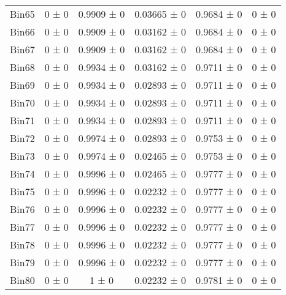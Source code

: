\begin{tabular}{@{\extracolsep{4pt}}lccccc@{}}
     Bin65 & 0 ± 0 & 0.9909 ± 0 & 0.03665 ± 0 & 0.9684 ± 0 & 0 ± 0 \\ 
     Bin66 & 0 ± 0 & 0.9909 ± 0 & 0.03162 ± 0 & 0.9684 ± 0 & 0 ± 0 \\ 
     Bin67 & 0 ± 0 & 0.9909 ± 0 & 0.03162 ± 0 & 0.9684 ± 0 & 0 ± 0 \\ 
     Bin68 & 0 ± 0 & 0.9934 ± 0 & 0.03162 ± 0 & 0.9711 ± 0 & 0 ± 0 \\ 
     Bin69 & 0 ± 0 & 0.9934 ± 0 & 0.02893 ± 0 & 0.9711 ± 0 & 0 ± 0 \\ 
     Bin70 & 0 ± 0 & 0.9934 ± 0 & 0.02893 ± 0 & 0.9711 ± 0 & 0 ± 0 \\ 
     Bin71 & 0 ± 0 & 0.9934 ± 0 & 0.02893 ± 0 & 0.9711 ± 0 & 0 ± 0 \\ 
     Bin72 & 0 ± 0 & 0.9974 ± 0 & 0.02893 ± 0 & 0.9753 ± 0 & 0 ± 0 \\ 
     Bin73 & 0 ± 0 & 0.9974 ± 0 & 0.02465 ± 0 & 0.9753 ± 0 & 0 ± 0 \\ 
     Bin74 & 0 ± 0 & 0.9996 ± 0 & 0.02465 ± 0 & 0.9777 ± 0 & 0 ± 0 \\ 
     Bin75 & 0 ± 0 & 0.9996 ± 0 & 0.02232 ± 0 & 0.9777 ± 0 & 0 ± 0 \\ 
     Bin76 & 0 ± 0 & 0.9996 ± 0 & 0.02232 ± 0 & 0.9777 ± 0 & 0 ± 0 \\ 
     Bin77 & 0 ± 0 & 0.9996 ± 0 & 0.02232 ± 0 & 0.9777 ± 0 & 0 ± 0 \\ 
     Bin78 & 0 ± 0 & 0.9996 ± 0 & 0.02232 ± 0 & 0.9777 ± 0 & 0 ± 0 \\ 
     Bin79 & 0 ± 0 & 0.9996 ± 0 & 0.02232 ± 0 & 0.9777 ± 0 & 0 ± 0 \\ 
     Bin80 & 0 ± 0 & 1 ± 0 & 0.02232 ± 0 & 0.9781 ± 0 & 0 ± 0 \\ 
\hline\hline
  \end{tabular}
